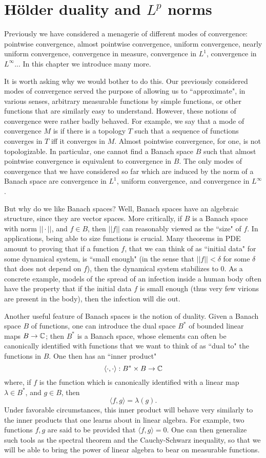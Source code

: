 \chapter{H\"older duality and $L^p$ norms}
Previously we have considered a menagerie of different modes of convergence: pointwise convergence, almost pointwise convergence, uniform convergence, nearly uniform convergence, convergence in measure, convergence in $L^1$, convergence in $L^\infty$...
In this chapter we introduce many more.

It is worth asking why we would bother to do this.
Our previously considered modes of convergence served the purpose of allowing us to ``approximate", in various senses, arbitrary measurable functions by simple functions, or other functions that are similarly easy to understand.
However, these notions of convergence were rather badly behaved.
For example, we say that a mode of convergence $M$ is  if there is a topology $T$ such that a sequence of functions converges in $T$ iff it converges in $M$.
Almost pointwise convergence, for one, is not topologizable.
In particular, one cannot find a Banach space $B$ such that almost pointwise convergence is equivalent to convergence in $B$.
The only modes of convergence that we have considered so far which are induced by the norm of a Banach space are convergence in $L^1$, uniform convergence, and convergence in $L^\infty$.

But why do we like Banach spaces? Well, Banach spaces have an algebraic structure, since they are vector spaces.
More critically, if $B$ is a Banach space with norm $||\cdot||$, and $f \in B$, then $||f||$ can reasonably viewed as the ``size" of $f$.
In applications, being able to size functions is crucial.
Many theorems in PDE amount to proving that if a function $f$, that we can think of as ``initial data" for some dynamical system, is ``small enough" (in the sense that $||f|| < \delta$ for some $\delta$ that does not depend on $f$), then the dynamical system stabilizes to $0$.
As a concrete example, models of the spread of an infection inside a human body often have the property that if the initial data $f$ is small enough (thus very few virions are present in the body), then the infection will die out.

Another useful feature of Banach spaces is the notion of duality.
Given a Banach space $B$ of functions, one can introduce the dual space $B^*$ of bounded linear maps $B \to \mathbb{C}$; then $B^*$ is a Banach space, whose elements can often be canonically identified with functions that we want to think of as ``dual to" the functions in $B$.
One then has an ``inner product"
$$\langle \cdot, \cdot\rangle: B^* \times B \to \mathbb{C}$$
where, if $f$ is the function which is canonically identified with a linear map $\lambda \in B^*$, and $g \in B$, then
$$\langle f, g\rangle = \lambda(g).$$
Under favorable circumstances, this inner product will behave very similarly to the inner products that one learns about in linear algebra.
For example, two functions $f, g$ are said to be  provided that $\langle f, g\rangle = 0$.
One can then generalize such tools as the spectral theorem and the Cauchy-Schwarz inequality, so that we will be able to bring the power of linear algebra to bear on measurable functions.

